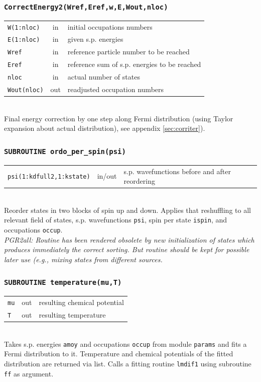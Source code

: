 \documentclass[final,1p]{elsarticle}
\newcommand{\PGRcomm}[1]{{\color{blue}\small\em PGR2all: #1}}
\begin{document}
\subsubsection*{\tt CorrectEnergy2(Wref,Eref,w,E,Wout,nloc)}
\begin{tabular}{lcl}
 {\tt W(1:nloc)} & in & initial occupations numbers\\
 {\tt E(1:nloc)} & in & given s.p. energies\\
 {\tt Wref} & in & reference particle number to be reached\\
 {\tt Eref} & in &  reference sum of s.p. energies to be reached\\
 {\tt nloc} & in & actual number of states\\
 {\tt Wout(nloc)} & out  & readjusted occupation numbers\\
\end{tabular}
\\[4pt]
Final energy correction by one step along Fermi distribution
(using Taylor expansion about actual distribution),
see appendix \ref{sec:corriter}).



\subsubsection*{\tt SUBROUTINE ordo\_per\_spin(psi)}
\begin{tabular}{lcl}
 {\tt psi(1:kdfull2,1:kstate)} & in/out & s.p. wavefunctions before
 and after reordering\\
\end{tabular}
\\[4pt]
Reorder states  in two blocks of spin up and down.
Applies that reshuffling to all relevant field of states,
s.p. wavefunctions {\tt psi}, spin per state {\tt ispin},
and occupations {\tt occup}. 
\\
\PGRcomm{Routine has been rendered obsolete by new initialization of
  states which produces immediately the correct sorting. But routine
  should be kept for possible later use (e.g., mixing states from
  different sources.}

\subsubsection*{\tt SUBROUTINE temperature(mu,T)}
\begin{tabular}{lcl}
 {\tt mu} & out & resulting chemical potential\\
 {\tt T} & out & resulting temperature\\
\end{tabular}
\\[4pt]
Takes s.p. energies {\tt amoy} and occupations {\tt occup} from module
{\tt params} and fits a Fermi distribution to it. Temperature and
chemical potentials of the fitted distribution are returned via list.
Calls a fitting routine {\tt lmdif1} using subroutine {\tt ff} as argument.
\end{document}
